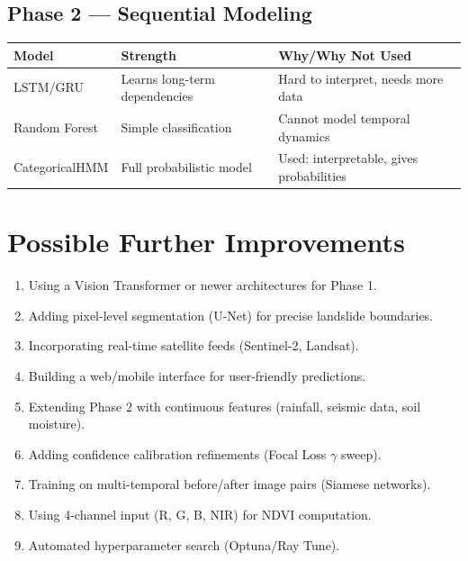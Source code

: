 \documentclass[11pt]{article}
\begin{document}
\subsection{Phase 2 --- Sequential Modeling}

\begin{table}[H]
    \centering
    \renewcommand{\arraystretch}{1.2}
    \begin{tabular}{lll}
        \toprule
        \textbf{Model} & \textbf{Strength} & \textbf{Why/Why Not Used} \\
        \midrule
        LSTM/GRU & Learns long-term dependencies & Hard to interpret, needs more data \\
        Random Forest & Simple classification & Cannot model temporal dynamics \\
        CategoricalHMM & Full probabilistic model & Used: interpretable, gives probabilities \\
        \bottomrule
    \end{tabular}
\end{table}

\section{Possible Further Improvements}

\begin{enumerate}
    \item Using a Vision Transformer or newer architectures for Phase 1.
    \item Adding pixel-level segmentation (U-Net) for precise landslide boundaries.
    \item Incorporating real-time satellite feeds (Sentinel-2, Landsat).
    \item Building a web/mobile interface for user-friendly predictions.
    \item Extending Phase 2 with continuous features (rainfall, seismic data, soil moisture).
    \item Adding confidence calibration refinements (Focal Loss $\gamma$ sweep).
    \item Training on multi-temporal before/after image pairs (Siamese networks).
    \item Using 4-channel input (R, G, B, NIR) for NDVI computation.
    \item Automated hyperparameter search (Optuna/Ray Tune).
\end{enumerate}
\end{document}
